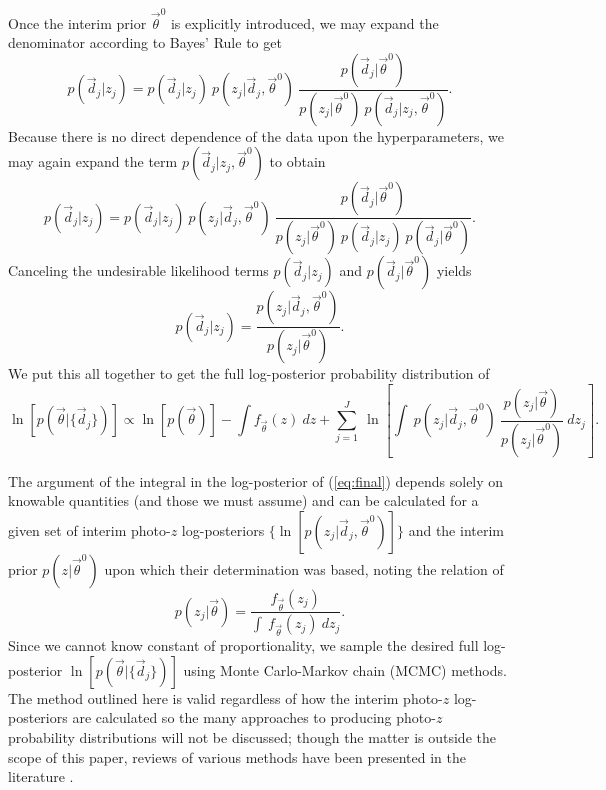 \documentclass[preprint]{aastex}
\begin{document}
Once the interim prior $\vec{\theta}^{0}$ is explicitly introduced, we may 
expand the denominator according to Bayes' Rule to get 
\begin{equation}
\label{eq:expand}
p(\vec{d}_{j}|z_{j}) = p(\vec{d}_{j}|z_{j})\ 
p(z_{j}|\vec{d}_{j},\vec{\theta}^{0})\ 
\frac{p(\vec{d}_{j}|\vec{\theta}^{0})}{p(z_{j}|\vec{\theta}^{0})\ 
p(\vec{d}_{j}|z_{j},\vec{\theta}^{0})}.
\end{equation}
Because there is no direct dependence of the data upon the hyperparameters, we 
may again expand the term $p(\vec{d}_{j}|z_{j},\vec{\theta}^{0})$ to obtain 
\begin{equation}
\label{eq:indterm}
p(\vec{d}_{j}|z_{j}) = p(\vec{d}_{j}|z_{j})\ 
p(z_{j}|\vec{d}_{j},\vec{\theta}^{0})\ 
\frac{p(\vec{d}_{j}|\vec{\theta}^{0})}{p(z_{j}|\vec{\theta}^{0})\ 
p(\vec{d}_{j}|z_{j})\ p(\vec{d}_{j}|\vec{\theta}^{0})}.
\end{equation}
Canceling the undesirable likelihood terms $p(\vec{d}_{j}|z_{j})$ and 
$p(\vec{d}_{j}|\vec{\theta}^{0})$ yields
\begin{equation}
\label{eq:cancel}
p(\vec{d}_{j}|z_{j}) = 
\frac{p(z_{j}|\vec{d}_{j},\vec{\theta}^{0})}{p(z_{j}|\vec{\theta}^{0})}.
\end{equation}
We put this all together to get the full log-posterior probability distribution 
of 
\begin{equation}
\label{eq:final}
\ln[p(\vec{\theta}|\{\vec{d}_{j}\})] \propto \ln[p(\vec{\theta})]-\int 
f_{\vec{\theta}}(z)\ dz + \sum_{j=1}^{J}\ \ln\left[\int\ 
p(z_{j}|\vec{d}_{j},\vec{\theta}^{0})\ 
\frac{p(z_{j}|\vec{\theta})}{p(z_{j}|\vec{\theta}^{0})}\ dz_{j}\right].
\end{equation}

The argument of the integral in the log-posterior of (\ref{eq:final}) depends 
solely on knowable quantities (and those we must assume) and can be calculated 
for a given set of interim photo-$z$ log-posteriors 
$\{\ln[p(z_{j}|\vec{d}_{j},\vec{\theta}^{0})]\}$ and the interim prior 
$p(z|\vec{\theta}^{0})$ upon which their determination was based, noting the 
relation of 
\begin{equation}
\label{eq:params}
p(z_{j}|\vec{\theta}) = \frac{f_{\vec{\theta}}(z_{j})}{\int\ 
f_{\vec{\theta}}(z_{j})\ dz_{j}}.
\end{equation}
Since we cannot know constant of proportionality, we sample the desired full 
log-posterior $\ln[p(\vec{\theta}|\{\vec{d}_{j}\})]$ using Monte Carlo-Markov 
chain (MCMC) methods.  The method outlined here is valid regardless of how the 
interim photo-$z$ log-posteriors are calculated so the many approaches to 
producing photo-$z$ probability distributions will not be discussed; though the 
matter is outside the scope of this paper, reviews of various methods have been 
presented in the literature \citep{Sheldon2012, Ball2008, CarrascoKind2013, 
CarrascoKind2014a}.
\end{document}
